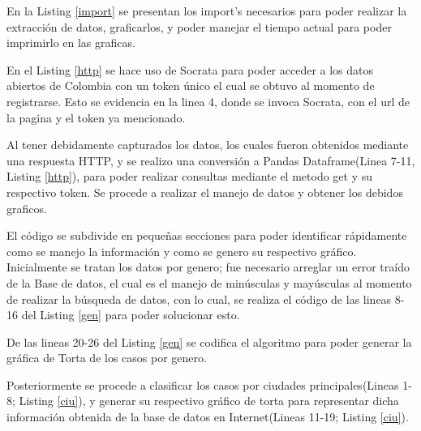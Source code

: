 \documentclass[conference,compsoc,onecolumn]{IEEEtran}
\begin{document}
En la Listing \ref{import} se presentan los import's necesarios para poder realizar la extracción de datos, graficarlos, y poder manejar el tiempo actual para poder imprimirlo en las graficas. 



En el Listing \ref{http} se hace uso de Socrata para poder acceder a los datos abiertos de Colombia con un token único el cual se obtuvo al momento de registrarse. Esto se evidencia en la linea 4, donde se invoca Socrata, con el url de la pagina y el token ya mencionado. 


Al tener debidamente capturados los datos, los cuales fueron obtenidos mediante una respuesta HTTP, y se realizo una conversión a Pandas Dataframe(Linea 7-11, Listing \ref{http}), para poder realizar consultas mediante el metodo get y su respectivo token. Se procede a realizar el manejo de datos y obtener los debidos graficos.

El código se subdivide en pequeñas secciones para poder identificar rápidamente como se manejo la información y como se genero su respectivo gráfico. Inicialmente se tratan los datos por genero; fue necesario arreglar un error traído de la Base de datos, el cual es el manejo de minúsculas y mayúsculas al momento de realizar la búsqueda de datos, con lo cual, se realiza el código de las lineas 8-16 del Listing \ref{gen} para poder solucionar esto.




De las lineas 20-26 del Listing \ref{gen} se codifica el algoritmo para poder generar la gráfica de Torta de los casos por genero.

Posteriormente se procede a clasificar los casos por ciudades principales(Lineas 1-8; Listing \ref{ciu}), y generar su respectivo gráfico de torta para representar dicha información obtenida de la base de datos en Internet(Lineas 11-19; Listing \ref{ciu}).



\end{document}
